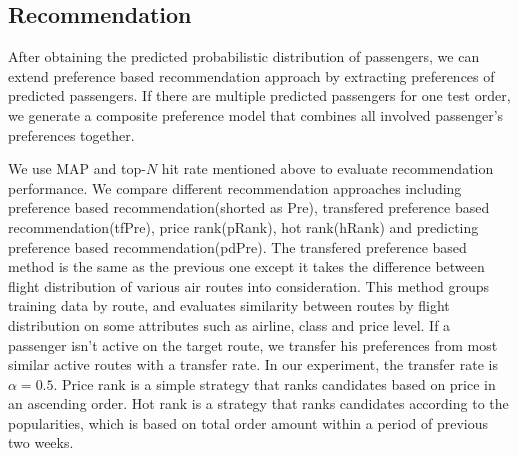 \documentclass{llncs}
\begin{document}
\subsection{Recommendation}
After obtaining the predicted probabilistic distribution of passengers, we can extend preference based recommendation approach by extracting preferences of predicted passengers. If there are multiple predicted passengers for one test order, we generate a composite preference model that combines all involved passenger's preferences together. \par
We use MAP and top-$N$ hit rate mentioned above to evaluate recommendation performance. We compare different recommendation approaches including preference based recommendation(shorted as Pre), transfered preference based recommendation(tfPre), price rank(pRank), hot rank(hRank) and predicting preference based recommendation(pdPre). The transfered preference based method is the same as the previous one except it takes the difference between flight distribution of various air routes into consideration. This method groups training data by route, and evaluates similarity between routes by flight distribution on some attributes such as airline, class and price level. If a passenger isn't active on the target route, we transfer his preferences from most similar active routes with a transfer rate. In our experiment, the transfer rate is  $ \alpha = 0.5$. Price rank is a simple strategy that ranks candidates based on price in an ascending order. Hot rank is a strategy that ranks candidates according to the popularities, which is based on total order amount within a period of previous two weeks. \par
\end{document}
